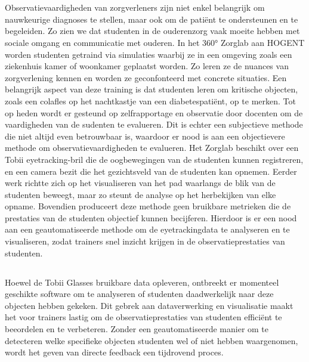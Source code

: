 
\chapter{}%
\label{ch:inleiding}

Observatievaardigheden van zorgverleners zijn niet enkel belangrijk om nauwkeurige diagnoses te stellen, maar ook om de patiënt te ondersteunen en te begeleiden. 
Zo zien we dat studenten in de ouderenzorg vaak moeite hebben met sociale omgang en communicatie met ouderen. 
In het 360° Zorglab aan HOGENT worden studenten getraind via simulaties waarbij ze in een omgeving zoals een ziekenhuis kamer of woonkamer geplaatst worden.
Zo leren ze de nuances van zorgverlening kennen en worden ze geconfonteerd met concrete situaties. 
Een belangrijk aspect van deze training is dat studenten leren om kritische objecten, zoals een colafles op het nachtkastje van een diabetespatiënt, op te merken.
Tot op heden wordt er gesteund op zelfrapportage en observatie door docenten om de vaardigheden van de sudenten te evalueren.
Dit is echter een subjectieve methode die niet altijd even betrouwbaar is, waardoor er nood is aan een objectievere methode om observatievaardigheden te evalueren.
Het Zorglab beschikt over een Tobii eyetracking-bril die de oogbewegingen van de studenten kunnen registreren, en een camera bezit die het gezichtsveld van de studenten kan opnemen.
Eerder werk richtte zich op het visualiseren van het pad waarlangs de blik van de studenten beweegt, maar zo steunt de analyse op het herbekijken van elke opname.
Bovendien produceert deze methode geen bruikbare metrieken die de prestaties van de studenten objectief kunnen becijferen.
Hierdoor is er een nood aan een geautomatiseerde methode om de eyetrackingdata te analyseren en te visualiseren, zodat trainers snel inzicht krijgen in de observatieprestaties van studenten.

\section{}%
\label{sec:probleemstelling}

Hoewel de Tobii Glasses bruikbare data opleveren, ontbreekt er momenteel geschikte software om te analyseren of studenten daadwerkelijk naar deze objecten hebben gekeken.
Dit gebrek aan dataverwerking en visualisatie maakt het voor trainers lastig om de observatieprestaties van studenten efficiënt te beeordelen en te verbeteren.
Zonder een geautomatiseerde manier om te detecteren welke specifieke objecten studenten wel of niet hebben waargenomen, wordt het geven van directe feedback een tijdrovend proces. 

